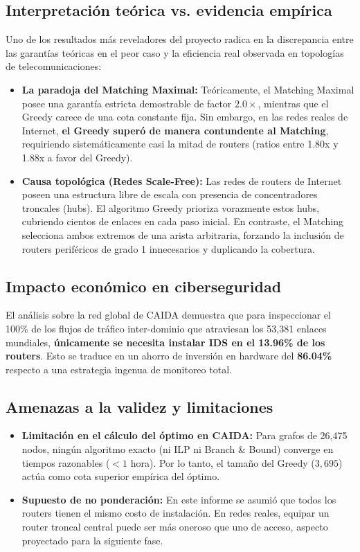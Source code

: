 \documentclass[11pt,a4paper]{article}
\begin{document}
\subsection{Interpretación teórica vs. evidencia empírica}
Uno de los resultados más reveladores del proyecto radica en la discrepancia entre las garantías teóricas en el peor caso y la eficiencia real observada en topologías de telecomunicaciones:
\begin{itemize}[itemsep=2pt]
	\item \textbf{La paradoja del Matching Maximal:} Teóricamente, el Matching Maximal posee una garantía estricta demostrable de factor $2.0\times$, mientras que el Greedy carece de una cota constante fija. Sin embargo, en las redes reales de Internet, \textbf{el Greedy superó de manera contundente al Matching}, requiriendo sistemáticamente casi la mitad de routers (ratios entre 1.80x y 1.88x a favor del Greedy).
	\item \textbf{Causa topológica (Redes Scale-Free):} Las redes de routers de Internet poseen una estructura libre de escala con presencia de concentradores troncales (hubs). El algoritmo Greedy prioriza vorazmente estos hubs, cubriendo cientos de enlaces en cada paso inicial. En contraste, el Matching selecciona ambos extremos de una arista arbitraria, forzando la inclusión de routers periféricos de grado 1 innecesarios y duplicando la cobertura.
\end{itemize}

\subsection{Impacto económico en ciberseguridad}
El análisis sobre la red global de CAIDA demuestra que para inspeccionar el 100\% de los flujos de tráfico inter-dominio que atraviesan los 53,381 enlaces mundiales, \textbf{únicamente se necesita instalar IDS en el 13.96\% de los routers}. Esto se traduce en un ahorro de inversión en hardware del \textbf{86.04\%} respecto a una estrategia ingenua de monitoreo total.

\subsection{Amenazas a la validez y limitaciones}
\begin{itemize}[itemsep=1pt]
	\item \textbf{Limitación en el cálculo del óptimo en CAIDA:} Para grafos de 26,475 nodos, ningún algoritmo exacto (ni ILP ni Branch \& Bound) converge en tiempos razonables ($<1$ hora). Por lo tanto, el tamaño del Greedy ($3,695$) actúa como cota superior empírica del óptimo.
	\item \textbf{Supuesto de no ponderación:} En este informe se asumió que todos los routers tienen el mismo costo de instalación. En redes reales, equipar un router troncal central puede ser más oneroso que uno de acceso, aspecto proyectado para la siguiente fase.
\end{itemize}
\end{document}
